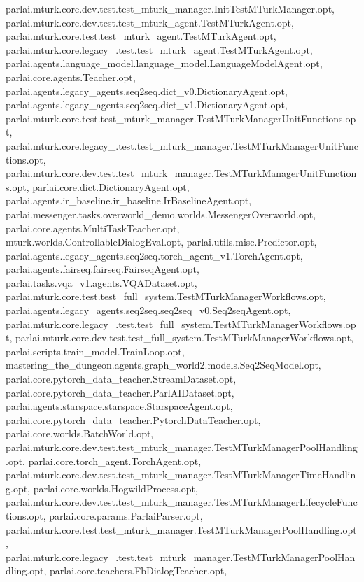 parlai.\+mturk.\+core.\+dev.\+test.\+test\+\_\+mturk\+\_\+manager.\+Init\+Test\+M\+Turk\+Manager.\+opt, parlai.\+mturk.\+core.\+dev.\+test.\+test\+\_\+mturk\+\_\+agent.\+Test\+M\+Turk\+Agent.\+opt, parlai.\+mturk.\+core.\+test.\+test\+\_\+mturk\+\_\+agent.\+Test\+M\+Turk\+Agent.\+opt, parlai.\+mturk.\+core.\+legacy\+\_.\+test.\+test\+\_\+mturk\+\_\+agent.\+Test\+M\+Turk\+Agent.\+opt, parlai.\+agents.\+language\+\_\+model.\+language\+\_\+model.\+Language\+Model\+Agent.\+opt, parlai.\+core.\+agents.\+Teacher.\+opt, parlai.\+agents.\+legacy\+\_\+agents.\+seq2seq.\+dict\+\_\+v0.\+Dictionary\+Agent.\+opt, parlai.\+agents.\+legacy\+\_\+agents.\+seq2seq.\+dict\+\_\+v1.\+Dictionary\+Agent.\+opt, parlai.\+mturk.\+core.\+test.\+test\+\_\+mturk\+\_\+manager.\+Test\+M\+Turk\+Manager\+Unit\+Functions.\+opt, parlai.\+mturk.\+core.\+legacy\+\_.\+test.\+test\+\_\+mturk\+\_\+manager.\+Test\+M\+Turk\+Manager\+Unit\+Functions.\+opt, parlai.\+mturk.\+core.\+dev.\+test.\+test\+\_\+mturk\+\_\+manager.\+Test\+M\+Turk\+Manager\+Unit\+Functions.\+opt, parlai.\+core.\+dict.\+Dictionary\+Agent.\+opt, parlai.\+agents.\+ir\+\_\+baseline.\+ir\+\_\+baseline.\+Ir\+Baseline\+Agent.\+opt, parlai.\+messenger.\+tasks.\+overworld\+\_\+demo.\+worlds.\+Messenger\+Overworld.\+opt, parlai.\+core.\+agents.\+Multi\+Task\+Teacher.\+opt, mturk.\+worlds.\+Controllable\+Dialog\+Eval.\+opt, parlai.\+utils.\+misc.\+Predictor.\+opt, parlai.\+agents.\+legacy\+\_\+agents.\+seq2seq.\+torch\+\_\+agent\+\_\+v1.\+Torch\+Agent.\+opt, parlai.\+agents.\+fairseq.\+fairseq.\+Fairseq\+Agent.\+opt, parlai.\+tasks.\+vqa\+\_\+v1.\+agents.\+V\+Q\+A\+Dataset.\+opt, parlai.\+mturk.\+core.\+test.\+test\+\_\+full\+\_\+system.\+Test\+M\+Turk\+Manager\+Workflows.\+opt, parlai.\+agents.\+legacy\+\_\+agents.\+seq2seq.\+seq2seq\+\_\+v0.\+Seq2seq\+Agent.\+opt, parlai.\+mturk.\+core.\+legacy\+\_.\+test.\+test\+\_\+full\+\_\+system.\+Test\+M\+Turk\+Manager\+Workflows.\+opt, parlai.\+mturk.\+core.\+dev.\+test.\+test\+\_\+full\+\_\+system.\+Test\+M\+Turk\+Manager\+Workflows.\+opt, parlai.\+scripts.\+train\+\_\+model.\+Train\+Loop.\+opt, mastering\+\_\+the\+\_\+dungeon.\+agents.\+graph\+\_\+world2.\+models.\+Seq2\+Seq\+Model.\+opt, parlai.\+core.\+pytorch\+\_\+data\+\_\+teacher.\+Stream\+Dataset.\+opt, parlai.\+core.\+pytorch\+\_\+data\+\_\+teacher.\+Parl\+A\+I\+Dataset.\+opt, parlai.\+agents.\+starspace.\+starspace.\+Starspace\+Agent.\+opt, parlai.\+core.\+pytorch\+\_\+data\+\_\+teacher.\+Pytorch\+Data\+Teacher.\+opt, parlai.\+core.\+worlds.\+Batch\+World.\+opt, parlai.\+mturk.\+core.\+dev.\+test.\+test\+\_\+mturk\+\_\+manager.\+Test\+M\+Turk\+Manager\+Pool\+Handling.\+opt, parlai.\+core.\+torch\+\_\+agent.\+Torch\+Agent.\+opt, parlai.\+mturk.\+core.\+dev.\+test.\+test\+\_\+mturk\+\_\+manager.\+Test\+M\+Turk\+Manager\+Time\+Handling.\+opt, parlai.\+core.\+worlds.\+Hogwild\+Process.\+opt, parlai.\+mturk.\+core.\+dev.\+test.\+test\+\_\+mturk\+\_\+manager.\+Test\+M\+Turk\+Manager\+Lifecycle\+Functions.\+opt, parlai.\+core.\+params.\+Parlai\+Parser.\+opt, parlai.\+mturk.\+core.\+test.\+test\+\_\+mturk\+\_\+manager.\+Test\+M\+Turk\+Manager\+Pool\+Handling.\+opt, parlai.\+mturk.\+core.\+legacy\+\_.\+test.\+test\+\_\+mturk\+\_\+manager.\+Test\+M\+Turk\+Manager\+Pool\+Handling.\+opt, parlai.\+core.\+teachers.\+Fb\+Dialog\+Teacher.\+opt, 